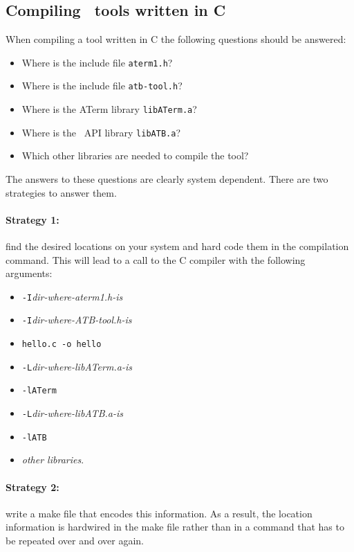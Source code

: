 \documentclass[twoside]{article} %
\begin{document}
\subsection{\label{CompilingTools}Compiling \TB\ tools written in C}
When compiling a tool written in C the following questions
should be answered:
\begin{itemize}
\item Where is the include file {\tt aterm1.h}?
\item Where is the include file {\tt atb-tool.h}?
\item Where is the ATerm library {\tt libATerm.a}?
\item Where is the \TB\ API library {\tt libATB.a}?
\item Which other libraries are needed to compile the tool?
\end{itemize}

The answers to these questions are clearly system dependent.
There are two strategies to answer them.

\paragraph{Strategy 1:} find the desired locations on your system and hard code them in
the compilation command. This will lead to a call to the C compiler
with the following arguments:

\begin{itemize}
\item {\tt -I}\emph{dir-where-aterm1.h-is}
\item {\tt -I}\emph{dir-where-ATB-tool.h-is}
\item {\tt hello.c -o hello}
\item {\tt -L}\emph{dir-where-libATerm.a-is}

\item {\tt -lATerm}
\item {\tt -L}\emph{dir-where-libATB.a-is}
\item {\tt -lATB}
\item \emph{other libraries}.
\end{itemize}

\paragraph{Strategy 2:}  write a make file that encodes this information.
As a result, the location information is hardwired in the make file
rather than in a command that has to be repeated over and over again.
\end{document}
